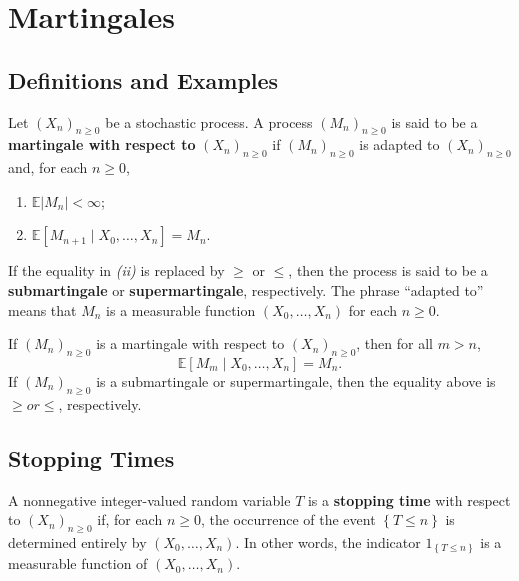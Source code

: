 \section{Martingales}

\subsection{Definitions and Examples}

\begin{defn}{}{}
Let \( (X_{n} )_{n\geq 0} \) be a stochastic process. A process \( (M_{n} )_{n\geq 0} \) is said to be a \textbf{martingale with respect to } \( (X_{n} )_{n\geq 0} \) if \( (M_{n} )_{n\geq 0} \) is adapted to \( (X_{n} )_{n\geq 0} \) and, for each \( n\geq 0 \), 
\begin{enumerate}[label  = \emph{(\roman*)}]
    \item \( \mathbb{E} \left\lvert M_{n}  \right\rvert< \infty   \);
    \item \( \mathbb{E} [M_{n + 1} \mid  X_0,\dots , X_{n} ] = M_{n}  \). 
\end{enumerate}
If the equality in \emph{(ii)} is replaced by \( \geq \text{ or } \leq  \), then the process is said to be a \textbf{submartingale} or \textbf{supermartingale}, respectively. The phrase “adapted to” means that \( M_{n}  \) is a measurable function \( (X_0, \dots , X_{n} ) \) for each \( n\geq 0. \)
\end{defn}

\begin{idea}{}{}
If \( (M_{n} )_{n\geq 0} \) is a martingale with respect to \( (X_{n} )_{n\geq 0} \), then for all \( m>n \), 
\[
    \mathbb{E} [M_{m} \mid X_0, \dots , X_{n} ]   = M_{n} . 
\]
If \( (M_{n} )_{n \geq 0} \) is a submartingale or supermartingale, then the equality above is \( \geq  or \leq  \), respectively. 
\end{idea}


\subsection{Stopping Times}

\begin{defn}{}{}
    A nonnegative integer-valued random variable \(T\) is a \textbf{stopping time} with respect to \( (X_{n} )_{n\geq 0} \) if, for each \(n\geq 0\), the occurrence of the event \(\left\{ T\leq n \right\} \) is determined entirely by \(( X _0, \dots , X_{n}  ) \). In other words, the indicator \(1_{\left\{ T\leq n \right\} }\) is a measurable function of \((X_0, \dots  , X_{n} )\). 
\end{defn}

